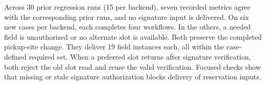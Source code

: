 Across 30 prior regression runs (15 per backend), seven recorded metrics agree with the corresponding prior runs, and no signature input is delivered. On six new cases per backend, each completes four workflows. In the others, a needed field is unauthorized or no alternate slot is available. Both preserve the completed pickup-site change. They deliver 19 field instances each, all within the case-defined required set. When a preferred slot returns after signature verification, both reject the old slot read and reuse the valid verification. Focused checks show that missing or stale signature authorization blocks delivery of reservation inputs.





